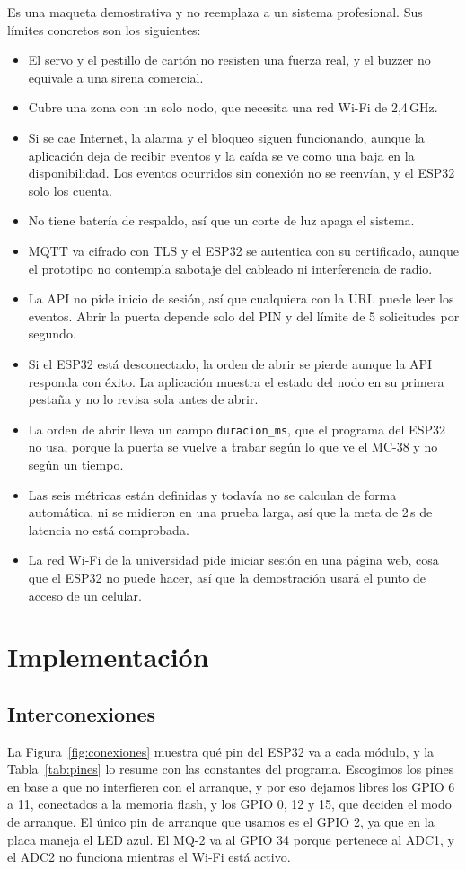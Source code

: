 \documentclass[manuscript,screen,nonacm]{acmart}
\begin{document}
Es una maqueta demostrativa y no reemplaza a un sistema profesional. Sus límites concretos son los siguientes:
\begin{itemize}
  \item El servo y el pestillo de cartón no resisten una fuerza real, y el buzzer no equivale a una sirena comercial.
  \item Cubre una zona con un solo nodo, que necesita una red Wi-Fi de 2,4\,GHz.
  \item Si se cae Internet, la alarma y el bloqueo siguen funcionando, aunque la aplicación deja de recibir eventos y la caída se ve como una baja en la disponibilidad. Los eventos ocurridos sin conexión no se reenvían, y el ESP32 solo los cuenta.
  \item No tiene batería de respaldo, así que un corte de luz apaga el sistema.
  \item MQTT va cifrado con TLS y el ESP32 se autentica con su certificado, aunque el prototipo no contempla sabotaje del cableado ni interferencia de radio.
  \item La API no pide inicio de sesión, así que cualquiera con la URL puede leer los eventos. Abrir la puerta depende solo del PIN y del límite de 5 solicitudes por segundo.
  \item Si el ESP32 está desconectado, la orden de abrir se pierde aunque la API responda con éxito. La aplicación muestra el estado del nodo en su primera pestaña y no lo revisa sola antes de abrir.
  \item La orden de abrir lleva un campo \texttt{duracion\_ms}, que el programa del ESP32 no usa, porque la puerta se vuelve a trabar según lo que ve el MC-38 y no según un tiempo.
  \item Las seis métricas están definidas y todavía no se calculan de forma automática, ni se midieron en una prueba larga, así que la meta de 2\,s de latencia no está comprobada.
  \item La red Wi-Fi de la universidad pide iniciar sesión en una página web, cosa que el ESP32 no puede hacer, así que la demostración usará el punto de acceso de un celular.
\end{itemize}

\section{Implementación}
\label{sec:implementacion}

\subsection{Interconexiones}
La Figura~\ref{fig:conexiones} muestra qué pin del ESP32 va a cada módulo, y la Tabla~\ref{tab:pines} lo resume con las constantes del programa. Escogimos los pines en base a que no interfieren con el arranque, y por eso dejamos libres los GPIO 6 a 11, conectados a la memoria flash, y los GPIO 0, 12 y 15, que deciden el modo de arranque. El único pin de arranque que usamos es el GPIO 2, ya que en la placa maneja el LED azul. El MQ-2 va al GPIO 34 porque pertenece al ADC1, y el ADC2 no funciona mientras el Wi-Fi está activo.
\end{document}
